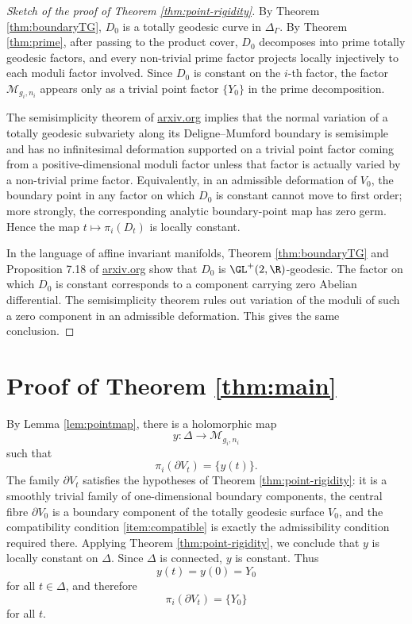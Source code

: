 \documentclass[11pt]{article}
\theoremstyle{definition}
\newcommand{\M}{\mathcal M}
\begin{document}
\begin{proof}[Sketch of the proof of Theorem \ref{thm:point-rigidity}]
By Theorem \ref{thm:boundaryTG}, $D_0$ is a totally geodesic curve in $\Delta_\Gamma$.  By Theorem \ref{thm:prime}, after passing to the product cover, $D_0$ decomposes into prime totally geodesic factors, and every non-trivial prime factor projects locally injectively to each moduli factor involved.  Since $D_0$ is constant on the $i$-th factor, the factor $\M_{g_i,n_i}$ appears only as a trivial point factor $\{Y_0\}$ in the prime decomposition.

The semisimplicity theorem of
\href{https://arxiv.org/html/2412.16330v2}{arxiv.org}
implies that the normal variation of a totally geodesic subvariety along its Deligne--Mumford boundary is semisimple and has no infinitesimal deformation supported on a trivial point factor coming from a positive-dimensional moduli factor unless that factor is actually varied by a non-trivial prime factor.  Equivalently, in an admissible deformation of $V_0$, the boundary point in any factor on which $D_0$ is constant cannot move to first order; more strongly, the corresponding analytic boundary-point map has zero germ.  Hence the map $t\mapsto \pi_i(D_t)$ is locally constant.

In the language of affine invariant manifolds, Theorem \ref{thm:boundaryTG} and Proposition 7.18 of
\href{https://arxiv.org/html/2412.06765v1}{arxiv.org}
show that $D_0$ is $\GL^+(2,\R)$-geodesic.  The factor on which $D_0$ is constant corresponds to a component carrying zero Abelian differential.  The semisimplicity theorem rules out variation of the moduli of such a zero component in an admissible deformation.  This gives the same conclusion.
\end{proof}

\section{Proof of Theorem \ref{thm:main}}

By Lemma \ref{lem:pointmap}, there is a holomorphic map
\[
y:\Delta\longrightarrow \M_{g_i,n_i}
\]
such that
\[
\pi_i(\partial V_t)=\{y(t)\}.
\]
The family $\partial V_t$ satisfies the hypotheses of Theorem \ref{thm:point-rigidity}: it is a smoothly trivial family of one-dimensional boundary components, the central fibre $\partial V_0$ is a boundary component of the totally geodesic surface $V_0$, and the compatibility condition \eqref{item:compatible} is exactly the admissibility condition required there.  Applying Theorem \ref{thm:point-rigidity}, we conclude that $y$ is locally constant on $\Delta$.  Since $\Delta$ is connected, $y$ is constant.  Thus
\[
y(t)=y(0)=Y_0
\]
for all $t\in\Delta$, and therefore
\[
\pi_i(\partial V_t)=\{Y_0\}
\]
for all $t$.
\end{document}
